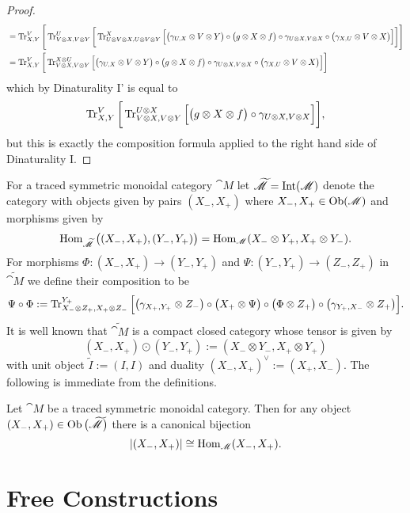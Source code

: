 \begin{proof}
{\begin{align*}
  &=\operatorname{Tr}^V_{X,Y}\Bigg[\operatorname{Tr}^U_{V\otimes X,V\otimes Y}\bigg[\operatorname{Tr}^X_{U\otimes V\otimes X,U\otimes V\otimes Y}\Big[\big(\gamma_{U,X}\otimes V\otimes Y\big)\circ\big(g\otimes X\otimes f\big)\circ\gamma_{U\otimes X, V\otimes X}\circ\big(\gamma_{X,U}\otimes V\otimes X\big)\Big]\bigg]\Bigg]\\
  &=\operatorname{Tr}^V_{X,Y}\bigg[\operatorname{Tr}^{X\otimes U}_{V\otimes X,V\otimes Y}\Big[\big(\gamma_{U,X}\otimes V\otimes Y\big)\circ\big(g\otimes X\otimes f\big)\circ\gamma_{U\otimes X, V\otimes X}\circ\big(\gamma_{X,U}\otimes V\otimes X\big)\Big]\bigg]
 \end{align*}
 which by Dinaturality I' is equal to
 \[\operatorname{Tr}^V_{X,Y}\bigg[\operatorname{Tr}^{U\otimes X}_{V\otimes X,V\otimes Y}\Big[\big(g\otimes X\otimes f\big)\circ\gamma_{U\otimes X, V\otimes X}\Big]\bigg],\]
 but this is exactly the composition formula applied to the right hand side of Dinaturality I.}%
\end{proof}

For a traced symmetric monoidal category $\cat{M}$ let $\widetilde{\mathscr{M}}=\operatorname{Int}(\mathscr{M})$ denote the category with objects given by pairs $(X_-,X_+)$ where $X_-,X_+\in \operatorname{Ob}(\mathscr{M})$ and morphisms given by 
\[\operatorname{Hom}_{\widetilde{\mathscr{M}}}\big((X_-,X_+),(Y_-,Y_+)\big)=\operatorname{Hom}_{\mathscr{M}}(X_-\otimes Y_+,X_+\otimes Y_-).\]
For morphisms $\Phi:(X_-,X_+)\to(Y_-,Y_+)$ and $\Psi:(Y_-,Y_+)\to(Z_-,Z_+)$ in $\widetilde{\cat{M}}$ we define their composition to be
\[\Psi\circ\Phi:=\operatorname{Tr}^{Y_+}_{X_-\otimes Z_+,X_+\otimes Z_-}\Big[\big(\gamma_{X_+,Y_+}\otimes Z_-\big)\circ\big(X_+\otimes\Psi\big)\circ\big(\Phi\otimes Z_+\big)\circ\big(\gamma_{Y_+,X_-}\otimes Z_+\big)\Big].\]
It is well known that $\widetilde{\cat{M}}$ is a compact closed category whose tensor is given by
\[(X_-,X_+)\odot(Y_-,Y_+):=(X_-\otimes Y_-,X_+\otimes Y_+)\]
with unit object $\tilde I:=(I,I)$ and duality $(X_-,X_+)^\vee:=(X_+,X_-)$.  The following is immediate from the definitions.

\begin{lemma}

Let $\cat{M}$ be a traced symmetric monoidal category.  Then for any object $(X_-,X_+)\in\operatorname{Ob}\big(\widetilde{\mathscr{M}}\big)$ there is a canonical bijection
\[|(X_-,X_+)|\cong\operatorname{Hom}_{\mathscr{M}}(X_-,X_+).\]

\end{lemma}

\section{Free Constructions}

